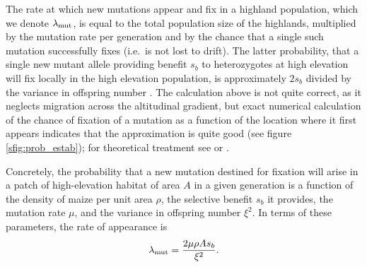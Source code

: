 The rate at which new mutations appear and fix in a highland population, which we denote $\lambda_{\text{mut}}$,
is equal to the total population size of the highlands, multiplied by the mutation rate per generation
and by the chance that a single such mutation successfully fixes
(i.e.\ is not lost to drift).
The latter probability, that a single new mutant allele providing benefit $s_b$ to heterozygotes at high elevation
will fix locally in the high elevation population,
is approximately $2s_b$ divided by the variance in offspring number \citep{jagers1975branching}.
The calculation above is not quite correct, as it neglects migration across the altitudinal gradient,
but exact numerical calculation of the chance of fixation of a mutation as a function of the location where it first appears
indicates that the approximation is quite good (see figure \ref{sfig:prob_estab});
for theoretical treatment see \citet{pollak1966survival} or \citet{barton1987establishment}.


Concretely, the probability that a new mutation destined for fixation
will arise in a patch of high-elevation habitat of area $A$ in a given generation
is a function of the density of maize per unit area $\rho$,
the selective benefit $s_b$ it provides,
the mutation rate $\mu$,
and the variance in offspring number $\xi^2$.
In terms of these parameters, the rate of appearance is
\begin{align} \label{eqn:mutrate}
  \lambda_{\text{mut}} = \frac{2 \mu \rho A s_b}{\xi^2} .
\end{align}

